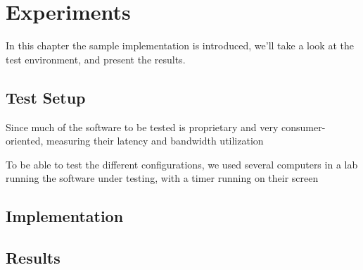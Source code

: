 \chapter{Experiments}\label{chp:experiments}

In this chapter the sample implementation is introduced, we'll take a look at the test environment, and present the results.

\section{Test Setup}

Since much of the software to be tested is proprietary and very consumer-oriented, measuring their latency and bandwidth utilization

To be able to test the different configurations, we used several computers in a lab running the software under testing, with a timer running on their screen


\section{Implementation}\label{sec:implementation}



\section{Results}

